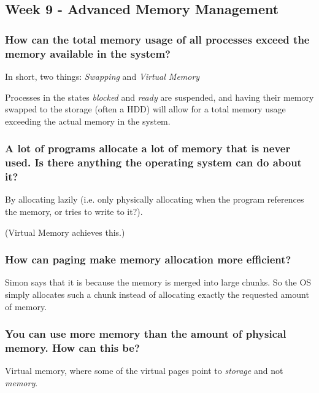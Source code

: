 \subsection*{Week 9 - Advanced Memory Management}
\subsubsection*{How can the total memory usage of all processes exceed the memory available in the system?}
In short, two things: \emph{Swapping} and \emph{Virtual Memory}

Processes in the states \emph{blocked} and \emph{ready} are suspended, and having their memory swapped to the storage (often a HDD) will allow for a total memory usage exceeding the actual memory in the system.



\subsubsection*{A lot of programs allocate a lot of memory that is never used. Is there anything the operating system can do about it?}
By allocating lazily (i.e. only physically allocating when the program references the memory, or tries to write to it?).

(Virtual Memory achieves this.)


\subsubsection*{How can paging make memory allocation more efficient?}
Simon says that it is because the memory is merged into large chunks. So the OS simply allocates such a chunk instead of allocating exactly the requested amount of memory.


\subsubsection*{You can use more memory than the amount of physical memory. How can this be?}
Virtual memory, where some of the virtual pages point to \emph{storage} and not \emph{memory}.